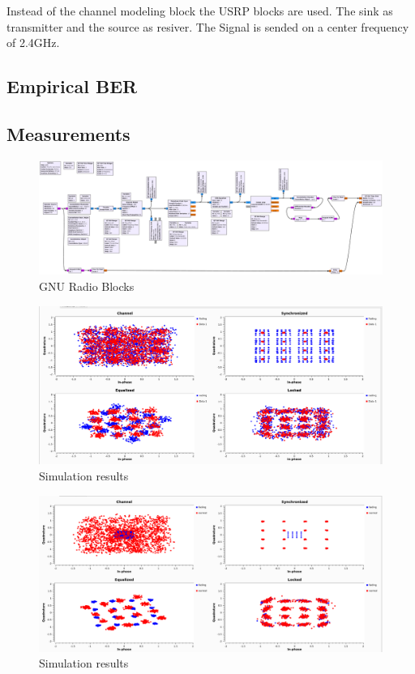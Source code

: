 Instead of the channel modeling block the USRP blocks are used. The sink as transmitter and the source as resiver.  The Signal is sended on a center frequency of 2.4GHz.

\subsection{Empirical BER} \label{sec:ber}

\subsection{Measurements}

%
%
%

\begin{figure}
	\includegraphics[width=\linewidth]{./figures/pdfs/qam_nogui.pdf}
	\caption{GNU Radio Blocks}
	\label{fig:simul16QAM_block}	
\end{figure}

\begin{figure}
	\includegraphics[width=\linewidth]{./figures/screenshots/QAM16_Fading_2.png}
	\caption{Simulation results}
	\label{fig:simul16QAM}	
\end{figure}

\begin{figure}
	\includegraphics[width=\linewidth]{./figures/screenshots/QAM16_Fading_2_.png}
	\caption{Simulation results}
	\label{fig:simul16QAM_1}	
\end{figure}

